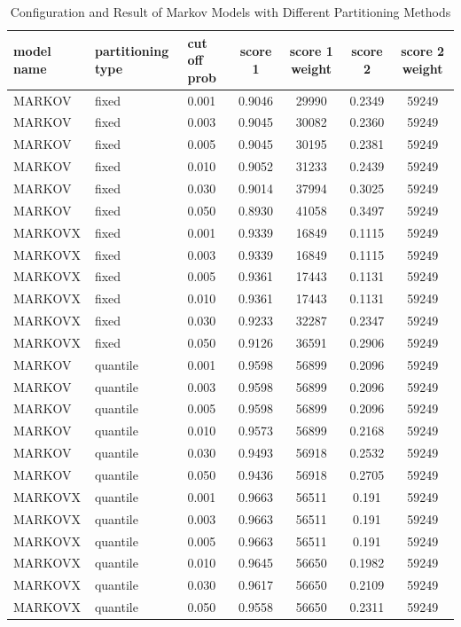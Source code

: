 \documentclass{article}
\begin{document}
\begin{longtable}[htbp]{l|l|l|*{4}{c}}
    \caption{Configuration and Result of Markov Models with Different Partitioning Methods}
    \label{tab:tab1.3.4}\\
    \textbf{model name} & \textbf{partitioning type} & \textbf{cut off prob} &
    \textbf{score 1} & \textbf{score 1 weight} & \textbf{score 2} &
    \textbf{score 2 weight} \\
    \hline
    MARKOV & fixed & 0.001 & 0.9046 & 29990 & 0.2349 & 59249\\
    MARKOV & fixed & 0.003 & 0.9045 & 30082 & 0.2360 & 59249\\
    MARKOV & fixed & 0.005 & 0.9045 & 30195 & 0.2381 & 59249\\
    MARKOV & fixed & 0.010 & 0.9052 & 31233 & 0.2439 & 59249\\
    MARKOV & fixed & 0.030 & 0.9014 & 37994 & 0.3025 & 59249\\
    MARKOV & fixed & 0.050 & 0.8930 & 41058 & 0.3497 & 59249\\
    MARKOVX & fixed & 0.001 & 0.9339 & 16849 & 0.1115 & 59249\\
    MARKOVX & fixed & 0.003 & 0.9339 & 16849 & 0.1115 & 59249\\
    MARKOVX & fixed & 0.005 & 0.9361 & 17443 & 0.1131 & 59249\\
    MARKOVX & fixed & 0.010 & 0.9361 & 17443 & 0.1131 & 59249\\
    MARKOVX & fixed & 0.030 & 0.9233 & 32287 & 0.2347 & 59249\\
    MARKOVX & fixed & 0.050 & 0.9126 & 36591 & 0.2906 & 59249\\
    MARKOV & quantile & 0.001 & 0.9598 & 56899 & 0.2096 & 59249\\
    MARKOV & quantile & 0.003 & 0.9598 & 56899 & 0.2096 & 59249\\
    MARKOV & quantile & 0.005 & 0.9598 & 56899 & 0.2096 & 59249\\
    MARKOV & quantile & 0.010 & 0.9573 & 56899 & 0.2168 & 59249\\
    MARKOV & quantile & 0.030 & 0.9493 & 56918 & 0.2532 & 59249\\
    MARKOV & quantile & 0.050 & 0.9436 & 56918 & 0.2705 & 59249\\
    MARKOVX & quantile & 0.001 & 0.9663 & 56511 & 0.191 & 59249\\
    MARKOVX & quantile & 0.003 & 0.9663 & 56511 & 0.191 & 59249\\
    MARKOVX & quantile & 0.005 & 0.9663 & 56511 & 0.191 & 59249\\
    MARKOVX & quantile & 0.010 & 0.9645 & 56650 & 0.1982 & 59249\\
    MARKOVX & quantile & 0.030 & 0.9617 & 56650 & 0.2109 & 59249\\
    MARKOVX & quantile & 0.050 & 0.9558 & 56650 & 0.2311 & 59249\\

\end{longtable}
\end{document}
